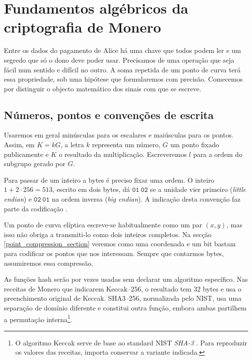 \chapter{Fundamentos algébricos da criptografia de Monero}
\label{chapter:basicConcepts}



Entre os dados do pagamento de Alice há uma chave que todos podem
ler e um segredo que só o dono deve poder usar. Precisamos de uma
operação que seja fácil num sentido e difícil no outro. A soma
repetida de um ponto de curva terá essa propriedade, sob uma hipótese
que formularemos com precisão. Comecemos por distinguir o objecto
matemático dos sinais com que se escreve.

\section{Números, pontos e convenções de escrita}

Usaremos em geral minúsculas para os escalares e maiúsculas para os
pontos. Assim, em \(K=kG\), a letra \(k\) representa um número,
\(G\) um ponto fixado publicamente e \(K\) o resultado da multiplicação.
Escreveremos \(l\) para a ordem do subgrupo gerado por \(G\).

Para passar de um inteiro a bytes é preciso fixar uma ordem. O inteiro
\(1+2\cdot256=513\), escrito em dois bytes, dá
\(\mathtt{01\ 02}\) se a unidade vier primeiro
(\emph{little endian}) e \(\mathtt{02\ 01}\) na ordem inversa
(\emph{big endian}). A indicação desta convenção faz parte da
codificação \cite{endianness}.

Um ponto de curva elíptica escreve-se habitualmente como um par \((x,y)\), mas
isso não obriga a transmiti-lo como dois inteiros completos. Na secção
\ref{point_compression_section} veremos como uma coordenada e um bit bastam
para codificar os pontos que nos interessam. Sempre que contarmos bytes,
assumiremos essa compressão.

%
As funções hash serão por vezes usadas sem declarar um algoritmo específico.
Nas receitas de Monero que indicarem Keccak--256,
 o resultado tem 32 bytes
e usa o preenchimento original de Keccak. SHA3--256, normalizada pelo NIST,
usa uma separação de domínio diferente e constitui outra função, embora
ambas partilhem a permutação interna\footnote{\label{kekkak_note}O algoritmo
Keccak serve de base ao standard NIST {\em SHA-3} \cite{nist-sha3}.
Para reproduzir os valores das receitas, importa conservar a variante
indicada.}.

